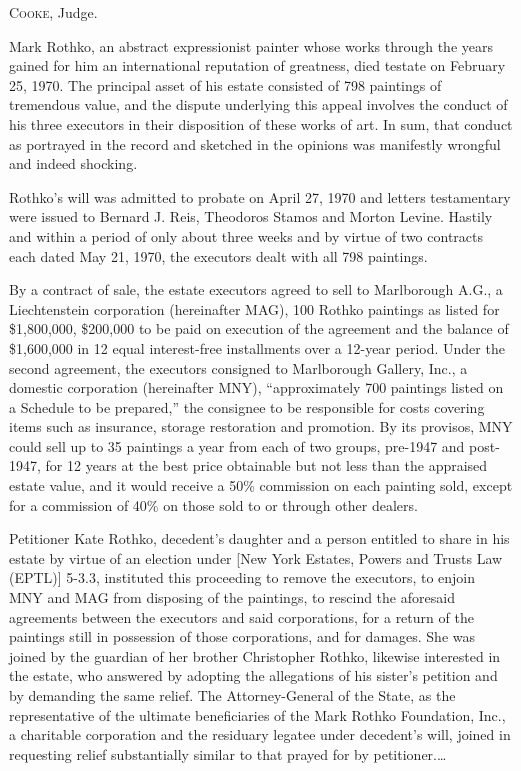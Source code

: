 

\opinion \textsc{Cooke}, Judge.

Mark Rothko, an abstract expressionist painter whose works through the years
gained for him an international reputation of greatness, died testate on
February 25, 1970. The principal asset of his estate consisted of 798 paintings
of tremendous value, and the dispute underlying this appeal involves the conduct
of his three executors in their disposition of these works of art. In sum, that
conduct as portrayed in the record and sketched in the opinions was manifestly
wrongful and indeed shocking.

Rothko's will was admitted to probate on April 27, 1970 and letters testamentary
were issued to Bernard J. Reis, Theodoros Stamos and Morton Levine. Hastily and
within a period of only about three weeks and by virtue of two contracts each
dated May 21, 1970, the executors dealt with all 798 paintings.

By a contract of sale, the estate executors agreed to sell to Marlborough A.G.,
a Liechtenstein corporation (hereinafter MAG), 100 Rothko paintings as listed
for \$1,800,000, \$200,000 to be paid on execution of the agreement and the
balance of \$1,600,000 in 12 equal interest-free installments over a 12-year
period. Under the second agreement, the executors consigned to Marlborough
Gallery, Inc., a domestic corporation (hereinafter MNY), ``approximately 700
paintings listed on a Schedule to be prepared,'' the consignee to be responsible
for costs covering items such as insurance, storage restoration and promotion.
By its provisos, MNY could sell up to 35 paintings a year from each of two
groups, pre-1947 and post-1947, for 12 years at the best price obtainable but
not less than the appraised estate value, and it would receive a 50\% commission
on each painting sold, except for a commission of 40\% on those sold to or
through other dealers.

Petitioner Kate Rothko, decedent's daughter and a person entitled to share in
his estate by virtue of an election under [New York Estates, Powers and Trusts
Law (EPTL)] 5-3.3, instituted this proceeding
to remove the executors, to enjoin MNY and MAG from disposing of the paintings,
to rescind the aforesaid agreements between the executors and said corporations,
for a return of the paintings still in possession of those corporations, and for
damages. She was joined by the guardian of her brother Christopher Rothko,
likewise interested in the estate, who answered by adopting the allegations of
his sister's petition and by demanding the same relief. The Attorney-General of
the State, as the representative of the ultimate beneficiaries of the Mark
Rothko Foundation, Inc., a charitable corporation and the residuary legatee
under decedent's will, joined in requesting relief substantially similar to that
prayed for by petitioner.\ldots

